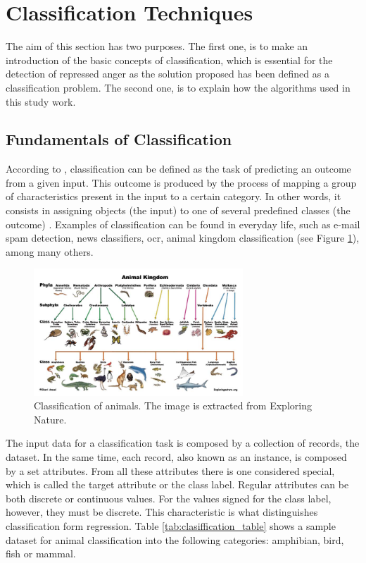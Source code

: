 
\section{Classification Techniques}
\label{sec:algorithms}

The aim of this section has two purposes. The first one, is to make an introduction of the basic concepts of classification, which is essential for the detection of repressed anger as the solution proposed has been defined as a classification problem. The second one, is to explain how the algorithms used in this study work.

\subsection{Fundamentals of Classification}

According to \cite{voznika2007data}, classification can be defined as the task of predicting an outcome from a given input. This outcome is produced by the process of mapping a group of characteristics present in the input to a certain category. In other words, it consists in assigning objects (the input) to one of several predefined classes (the outcome) \cite{pang2006introduction}. Examples of classification can be found in everyday life, such as e-mail spam detection, news classifiers, \acrfull{ocr}, animal kingdom classification (see Figure \ref{fig:animal_classification}), among many others.

\begin{figure}[!htp]
  \center
  \includegraphics[width=0.7\textwidth]{figures/animal_classification}
  \caption{Classification of animals. The image is extracted from Exploring Nature.}
  \label{fig:animal_classification}
\end{figure}

\FloatBarrier

The input data for a classification task is composed by a collection of records, the dataset. In the same time, each record, also known as an instance, is composed by a set attributes. From all these attributes there is one considered special, which is called the target attribute or the class label. Regular attributes can be both discrete or continuous values. For the values signed for the class label, however, they must be discrete. This characteristic is what distinguishes classification form regression. Table \ref{tab:clasiffication_table} shows a sample dataset for animal classification into the following categories: amphibian, bird, fish or mammal.

